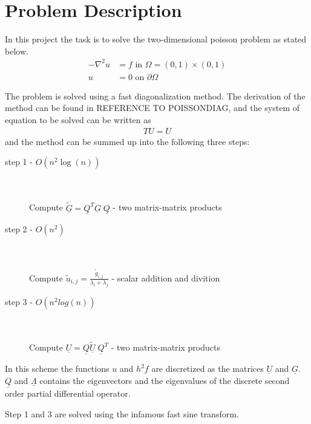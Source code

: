 \section{Problem Description}

In this project the task is to solve the two-dimensional poisson problem as stated below.
\begin{align}
	-\nabla^2 u &= f  \text{ in } \Omega = (0,1)\times(0,1) \\
	u &=  0 \text{ on } \partial \Omega
\end{align}

The problem is solved using a fast diagonalization method. The derivation of the method can be found in  REFERENCE TO POISSONDIAG,
and the system of equation to be solved can be written as 
\begin{align}
TU = U 	
\end{align}
and the method can be summed up into the following three steps:


\begin{description}
	\item[step 1  -  $O(n^2\log(n))$] \hfill \\ \hfill \\
		Compute $\underline{\tilde{G}} = \underline{Q}^T\underline{G} \; \underline{Q} $    -    two matrix-matrix products 
		\hfill \\
	\item[step 2  -  $O(n^2)$] \hfill \\ \hfill \\
		Compute $\tilde{u}_{i,j} = \frac{\tilde{g}_{i,j}}{\lambda_i+\lambda_j}$    -    scalar addition and divition
		\hfill \\
	\item[step 3  -  $O(n^2log(n))$] \hfill \\ \hfill \\
		Compute $\underline{U} = \underline{Q}\underline{\tilde{U}} \; \underline{Q}^T $    -     two matrix-matrix products 
\end{description}

In this scheme the functions $u$ and $h^2 f$ are discretized as the matrices $\underline{U}$ and $\underline{G}$. 
$\underline{Q}$ and $\underline{\Lambda}$ contains the eigenvectors and the eigenvalues of the discrete 
second order partial differential operator. 

Step 1 and 3 are solved using the infamous fast sine transform.
